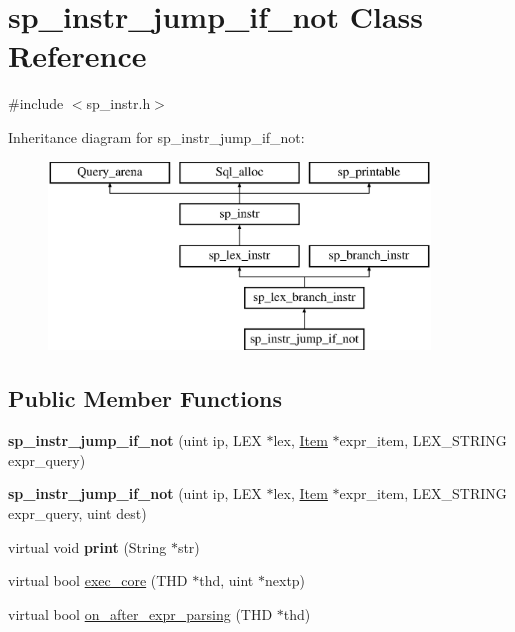 \hypertarget{classsp__instr__jump__if__not}{}\section{sp\+\_\+instr\+\_\+jump\+\_\+if\+\_\+not Class Reference}
\label{classsp__instr__jump__if__not}


{\ttfamily \#include $<$sp\+\_\+instr.\+h$>$}

Inheritance diagram for sp\+\_\+instr\+\_\+jump\+\_\+if\+\_\+not\+:\begin{figure}[H]
\begin{center}
\leavevmode
\includegraphics[height=5.000000cm]{classsp__instr__jump__if__not}
\end{center}
\end{figure}
\subsection*{Public Member Functions}
\begin{DoxyCompactItemize}
\item 
\mbox{\label{classsp__instr__jump__if__not_a8cc888d5337e97a0d999fc22cd781a8f}} 
{\bfseries sp\+\_\+instr\+\_\+jump\+\_\+if\+\_\+not} (uint ip, L\+EX $\ast$lex, \mbox{\hyperlink{classItem}{Item}} $\ast$expr\+\_\+item, L\+E\+X\+\_\+\+S\+T\+R\+I\+NG expr\+\_\+query)
\item 
\mbox{\label{classsp__instr__jump__if__not_a0b91cc130db0c5de3a05a7ff7ca9fd78}} 
{\bfseries sp\+\_\+instr\+\_\+jump\+\_\+if\+\_\+not} (uint ip, L\+EX $\ast$lex, \mbox{\hyperlink{classItem}{Item}} $\ast$expr\+\_\+item, L\+E\+X\+\_\+\+S\+T\+R\+I\+NG expr\+\_\+query, uint dest)
\item 
\mbox{\label{classsp__instr__jump__if__not_a9f17dde0ba59ee59a4fc59529dc095ba}} 
virtual void {\bfseries print} (String $\ast$str)
\item 
virtual bool \mbox{\hyperlink{classsp__instr__jump__if__not_a800bbb55787b6b07c78cf8d698d308bf}{exec\+\_\+core}} (T\+HD $\ast$thd, uint $\ast$nextp)
\item 
virtual bool \mbox{\hyperlink{classsp__instr__jump__if__not_af755479ad936f1b382516679a9ed1dcb}{on\+\_\+after\+\_\+expr\+\_\+parsing}} (T\+HD $\ast$thd)
\end{DoxyCompactItemize}
